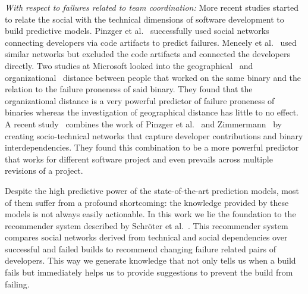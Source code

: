 \documentclass[12pt,oneside]{book}
\begin{document}
\emph{With respect to failures related to team coordination:}
More recent studies started to relate the social with the technical
dimensions of software development to build predictive models. Pinzger et
al.~\cite{pinzger:fse:2008} successfully used social networks connecting
developers via code artifacts to predict failures. Meneely et
al.~\cite{meneely:fse:2008} used similar networks but excluded the code artifacts
and connected the developers directly. Two studies at Microsoft looked into the
geographical~\cite{bird:acm:2009} and organizational~\cite{nagappan:icse:2008}
distance between people that worked on the same binary and the relation to the
failure proneness of said binary. They found that the organizational distance is
a very powerful predictor of failure proneness of binaries whereas the
investigation of geographical distance has little to no effect. A recent
study~\cite{bird:issre:2009} combines the work of Pinzger et
al.~\cite{pinzger:fse:2008} and
Zimmermann~\cite{zimmermann:icse:2008} by creating
socio-technical networks that capture developer contributions and binary
interdependencies. They found this combination to be a more powerful predictor
that works for different software project and even prevails across multiple
revisions of a project.

Despite the high predictive power of the state-of-the-art prediction models, most
of them suffer from a profound shortcoming: the knowledge provided by these
models is not always easily actionable. In this work we lie the foundation to
the recommender system described by Schr\"oter et
al.~\cite{schroeter:rsse:2008}. 
%
This recommender system compares social networks derived from technical and social dependencies over successful and failed builds to recommend changing failure related pairs of developers.
%
%
This way we generate knowledge that not only tells us when a build fails but immediately helps us to provide suggestions to prevent the build from failing.





\end{document}
